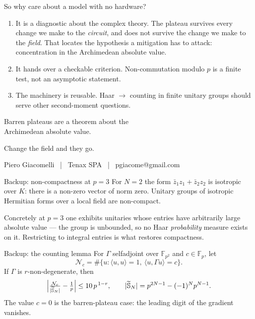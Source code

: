 \documentclass[aspectratio=169,10pt]{beamer}
\newcommand{\FF}{\mathbb{F}}
\newcommand{\inner}[2]{\langle #1, #2\rangle}
\begin{document}
\begin{frame}{So why care about a model with no hardware?}
  \begin{enumerate}
    \item \alert{It is a diagnostic about the complex theory.} The plateau
      survives every change we make to the \emph{circuit}, and does not survive
      the change we make to the \emph{field}. That locates the hypothesis a
      mitigation has to attack: concentration in the Archimedean absolute
      value.
    \item \alert{It hands over a checkable criterion.} Non-commutation modulo
      $p$ is a finite test, not an asymptotic statement.
    \item \alert{The machinery is reusable.} Haar $\to$ counting in finite
      unitary groups should serve other second-moment questions.
  \end{enumerate}
\end{frame}

\begin{frame}[standout]
  Barren plateaus are a theorem about the \\ Archimedean absolute value.

  \vspace{0.8em}
  Change the field and they go.

  \vspace{1.2em}
  \small Piero Giacomelli \, | \, Tenax SPA \, | \, pgiacome@gmail.com
\end{frame}

\appendix

\begin{frame}{Backup: non-compactness at $p=3$}
  For $N=2$ the form $\bar z_1z_1+\bar z_2z_2$ is isotropic over $K$: there is
  a non-zero vector of norm zero. Unitary groups of isotropic Hermitian forms
  over a local field are non-compact.

  \vspace{0.5em}
  Concretely at $p=3$ one exhibits unitaries whose entries have arbitrarily
  large absolute value --- the group is unbounded, so no Haar \emph{probability}
  measure exists on it. Restricting to integral entries is what restores
  compactness.
\end{frame}

\begin{frame}{Backup: the counting lemma}
  For $\Gamma$ selfadjoint over $\FF_{p^{2}}$ and $c\in\FF_p$, let
  \[
    \mathcal{N}_c=\#\{u : \inner uu=1,\ \inner u{\Gamma u}=c\}.
  \]
  If $\Gamma$ is $r$-non-degenerate, then
  \[
    \Bigl|\tfrac{\mathcal{N}_c}{|\widetilde{\mathbb{S}}_N|}-\tfrac1p\Bigr|
    \le 10\,p^{\,1-r},
    \qquad
    |\widetilde{\mathbb{S}}_N| = p^{2N-1}-(-1)^{N}p^{N-1}.
  \]
  The value $c=0$ is the barren-plateau case: the leading digit of the gradient
  vanishes.
\end{frame}
\end{document}
